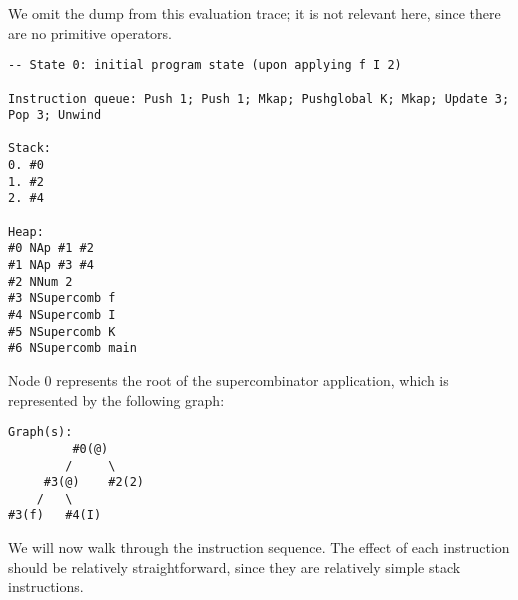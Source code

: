 We omit the dump from this evaluation trace; it is not relevant here, since there are no primitive operators.

\begin{verbatim}
-- State 0: initial program state (upon applying f I 2)

Instruction queue: Push 1; Push 1; Mkap; Pushglobal K; Mkap; Update 3; Pop 3; Unwind

Stack:
0. #0
1. #2
2. #4

Heap:
#0 NAp #1 #2
#1 NAp #3 #4
#2 NNum 2
#3 NSupercomb f
#4 NSupercomb I
#5 NSupercomb K
#6 NSupercomb main
\end{verbatim}

Node 0 represents the root of the supercombinator application, which is represented by the following graph:

\begin{verbatim}
Graph(s):
         #0(@)
        /     \
     #3(@)    #2(2)
    /   \
#3(f)   #4(I)
\end{verbatim}

We will now walk through the instruction sequence. The effect of each instruction should be relatively straightforward, since they are relatively simple stack instructions.


